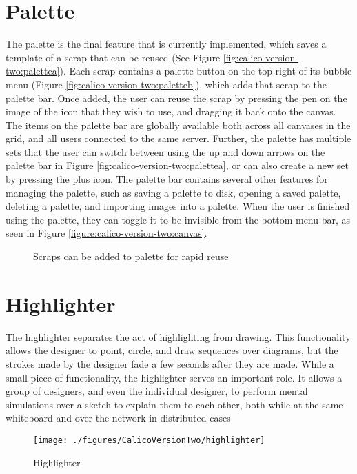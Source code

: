 \section{Palette}

The palette is the final feature that is currently implemented, which saves a template of a scrap that can be reused (See Figure \ref{fig:calico-version-two:palettea}). Each scrap contains a palette button on the top right of its bubble menu (Figure \ref{fig:calico-version-two:paletteb}), which adds that scrap to the palette bar. Once added, the user can reuse the scrap by pressing the pen on the image of the icon that they wish to use, and dragging it back onto the canvas. The items on the palette bar are globally available both across all canvases in the grid, and all users connected to the same server. Further, the palette has multiple sets that the user can switch between using the up and down arrows on the palette bar in Figure \ref{fig:calico-version-two:palettea}, or can also create a new set by pressing the plus icon. The palette bar contains several other features for managing the palette, such as saving a palette to disk, opening a saved palette, deleting a palette, and importing images into a palette. When the user is finished using the palette, they can toggle it to be invisible from the bottom menu bar, as seen in Figure \ref{figure:calico-version-two:canvas}.

\begin{figure}
  \centering
   \caption {Scraps can be added to palette for rapid reuse}
   \label{fig:calico-version-two:palette}
\end{figure}

\section{Highlighter}

The highlighter separates the act of highlighting from drawing. This functionality allows the designer to point, circle, and draw sequences over diagrams, but the strokes made by the designer fade a few seconds after they are made. While a small piece of functionality, the highlighter serves an important role. It allows a group of designers, and even the individual designer, to perform mental simulations over a sketch to explain them to each other, both while at the same whiteboard and over the network in distributed cases

\begin{figure*}[tbh]
  \centering
  \texttt{[image: ./figures/CalicoVersionTwo/highlighter]}
  \caption{Highlighter}
  \label{figure:calico-version-two:highlighter}
\end{figure*}

